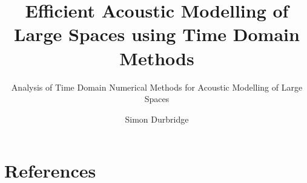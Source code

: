 \documentclass[]{svmono}
\begin{document}
\author{Simon Durbridge} %

\title{Efficient Acoustic Modelling of Large Spaces using Time Domain Methods} %

\subtitle{Analysis of Time Domain Numerical Methods for Acoustic Modelling of Large Spaces}
\maketitle

\frontmatter%

%
%
%
%

\tableofcontents
%

\mainmatter%

%


\backmatter%
\chapter{References}

%
%

\end{document}
